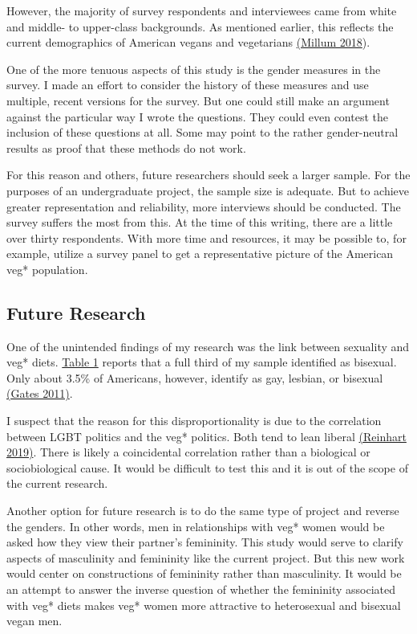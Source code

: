 \documentclass[twoside]{report}
\begin{document}
\begin{multicols}{2}
However, the majority of survey respondents and interviewees came from
white and middle- to upper-class backgrounds. As mentioned earlier, this reflects the current demographics of American vegans and vegetarians \hyperlink{millum}{(Millum 2018}).

One of the more tenuous aspects of this study is the gender measures in
the survey. I made an effort to consider the history of these measures
and use multiple, recent versions for the survey. But one could still
make an argument against the particular way I wrote the questions. They
could even contest the inclusion of these questions at all. Some may
point to the rather gender-neutral results as proof that these methods
do not work.

For this reason and others, future researchers should seek a larger
sample. For the purposes of an undergraduate project, the sample size is
adequate. But to achieve greater representation and reliability, more
interviews should be conducted. The survey suffers the most from this.
At the time of this writing, there are a little over thirty respondents. 
With more time and resources, it may be possible to, for example, utilize a survey
panel to get a representative picture of the American veg* population.

\hypertarget{future-research}{\subsection{Future Research}}

One of the unintended findings of my research was the link between
sexuality and veg* diets. \hyperlink{table-1}{Table 1} reports that a full third of my sample identified as bisexual. Only about 3.5\% of Americans, however, identify as gay, lesbian, or bisexual \hyperlink{gates}{(Gates 2011)}. 

I suspect that the reason for this disproportionality is due to the correlation between LGBT politics and the veg* politics. Both tend to lean liberal \hyperlink{reinhart}{(Reinhart 2019)}. There is likely a coincidental correlation rather than a biological or sociobiological cause. It would be difficult to test this and it is out of the scope of the current research.

Another option for future research is to do the same type of project and reverse the genders. In other words, men in relationships with
veg* women would be asked how they view their partner's femininity. This
study would serve to clarify aspects of masculinity and femininity
like the current project. But this new work would center on
constructions of femininity rather than masculinity. It would be an
attempt to answer the inverse question of whether the femininity
associated with veg* diets makes veg* women more attractive to
heterosexual and bisexual vegan men.

\end{multicols}
\end{document}
